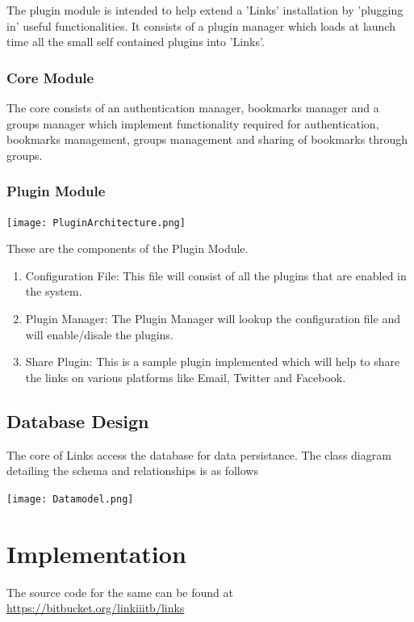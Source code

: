 \documentclass[11pt]{report} %
\begin{document}
\noindent
The plugin module is intended to help extend a 'Links' installation by 'plugging in' useful functionalities. It consists of a plugin manager which loads at launch time all the small self contained plugins into 'Links'.

\subsection{Core Module}
The core consists of an authentication manager, bookmarks manager and a groups manager which implement functionality required for authentication, bookmarks management, groups management and sharing of bookmarks through groups.

\subsection{Plugin Module}
\texttt{[image: PluginArchitecture.png]}

These are the components of the Plugin Module.
\begin{enumerate}

\item
	Configuration File: This file will consist of all the plugins that are enabled in the system.
\item
	Plugin Manager: The Plugin Manager will lookup the configuration file and will enable/disale the plugins.
\item
	Share Plugin: This is a sample plugin implemented which will help to share the links on various platforms like Email, Twitter and Facebook.
\end{enumerate}
\section{Database Design}
The core of Links access the database for data persistance. The class diagram detailing the schema and relationships is as follows

\texttt{[image: Datamodel.png]}

\chapter{Implementation}
The source code for the same can be found at \href{https://bitbucket.org/linkiiitb/links}{https://bitbucket.org/linkiiitb/links}
\end{document}
